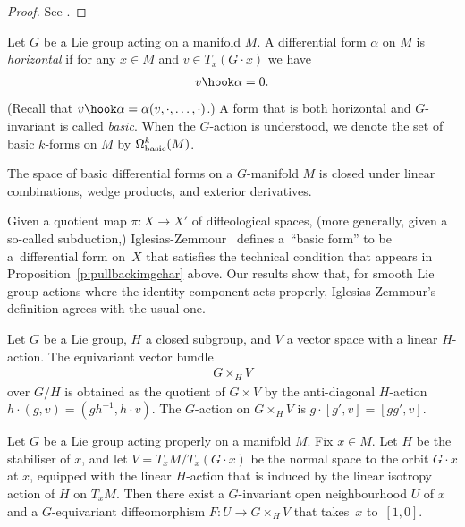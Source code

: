 \begin{proof}
See \cite[Section~2, Paragraph~1]{IK}.
\end{proof}

\begin{Definition} \label{d:basic form}
Let $G$ be a Lie group acting on a manifold $M$.
A dif\/ferential form $\alpha$ on $M$ is \emph{horizontal}
if for any $x \in M$ and $v \in T_x(G\cdot x)$ we have
\begin{gather*} v \hook \alpha = 0.\end{gather*}
(Recall that $v\hook\alpha=\alpha(v,\cdot,\dots,\cdot)$.)
A form that is both horizontal and $G$-invariant is called \emph{basic}.
When the $G$-action is understood,
we denote the set of basic $k$-forms on $M$ by $\Omega^k_{\rm basic}(M)$.
\end{Definition}

\begin{Remark} \label{r:wedge and d of basic}
The space of basic dif\/ferential forms on a $G$-manifold $M$
is closed under linear combinations, wedge products,
and exterior derivatives.
\end{Remark}

\begin{Remark}
Given a quotient map $\pi \colon X \to X'$ of dif\/feological spaces,
(more generally, given a so-called subduction,)
Iglesias-Zemmour~\cite[Section~6.38]{iglesias}
def\/ines a~``basic form'' to be a~dif\/ferential form on~$X$
that satisf\/ies the technical condition that appears in
Proposition~\ref{p:pullbackimgchar} above.
Our results show that, for smooth Lie group actions
where the identity component acts properly,
Iglesias-Zemmour's def\/inition agrees with the usual one.
\end{Remark}

Let $G$ be a Lie group, $H$ a closed subgroup, and $V$ a vector space
with a linear $H$-action. The equivariant vector bundle
\begin{gather*} G \times_H V \end{gather*}
over $G/H$ is obtained as the quotient of $G \times V$
by the anti-diagonal $H$-action $h \cdot (g,v) = (g h^{-1} , h \cdot v)$.
The $G$-action on $G\times_H V$ is $g\cdot[g',v]=[gg',v]$.

\begin{Theorem}
\label{t:slice theorem}
Let $G$ be a Lie group acting properly on a manifold $M$. Fix $x\in M$.
Let $H$ be the stabiliser of $x$, and let $V = T_x M / T_x(G\cdot x)$
be the normal space to the orbit $G\cdot x$ at $x$,
equipped with the linear $H$-action that is induced
by the linear isotropy action of $H$ on $T_xM$.
Then there exist a $G$-invariant open neighbourhood $U$ of $x$
and a $G$-equivariant diffeomorphism $F\colon U\to G\times_H V$
that takes~$x$ to~$[1,0]$.
\end{Theorem}

